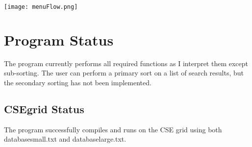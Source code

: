 \documentclass[11pt]{article}
\begin{document}
\vspace{.25cm}

\texttt{[image: menuFlow.png]}


\newpage


\section*{Program Status}

The program currently performs all required functions as I interpret them except sub-sorting. The user can perform a primary 
sort on a list of search results, but the secondary sorting has not been implemented.


\subsection*{CSEgrid Status}

The program successfully compiles and runs on the CSE grid using both databasesmall.txt and databaselarge.txt.
\end{document}
